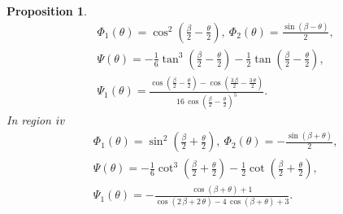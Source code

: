 \documentclass{article}
\def \Rfour{\uppercase\expandafter{\romannumeral4}}
\numberwithin{figure}{section}
\numberwithin{equation}{section}
\newtheorem{proposition}[lemma]{Proposition}
\theoremstyle{remark}
\theoremstyle{definition}
\begin{document}
\begin{proposition}
	\begin{equation}\label{explicit_form3}
		\begin{split}
			& \Phi_1(\theta)=\cos^2\left(\frac{\beta}{2}-\frac{\theta}{2}\right), \ \Phi_2(\theta)=\frac{\sin(\beta-\theta)}{2},\\
			&\Psi(\theta)=-\frac{1}{6}\tan^3\left(\frac{\beta}{2}-\frac{\theta}{2}\right)-\frac{1}{2}\tan\left(\frac{\beta}{2}-\frac{\theta}{2}\right),\\
                &\Psi_1(\theta)=\frac{\cos \left(\frac{\beta }{2}-\frac{\theta}{2}\right)-\cos \left(\frac{3\,\beta }{2}-\frac{3\,\theta}{2}\right)}{16\,{\cos \left(\frac{\beta }{2}-\frac{\theta}{2}\right)}^5 }.
		\end{split}
	\end{equation}
        In region $\Rfour$
	\begin{equation}\label{explicit_form4}
		\begin{split}
			& \Phi_1(\theta)=\sin^2\left(\frac{\beta}{2}+\frac{\theta}{2}\right), \ \Phi_2(\theta)=-\frac{\sin(\beta+\theta)}{2},\\
			&\Psi(\theta)=-\frac{1}{6}\cot^3\left(\frac{\beta}{2}+\frac{\theta}{2}\right)-\frac{1}{2}\cot\left(\frac{\beta}{2}+\frac{\theta}{2}\right),\\
                &\Psi_1(\theta)=-\frac{\cos \left(\beta +\theta\right)+1}{\cos \left(2\,\beta +2\,\theta\right)-4\,\cos \left(\beta +\theta\right)+3}.
		\end{split}
	\end{equation}
\end{proposition}
\end{document}
